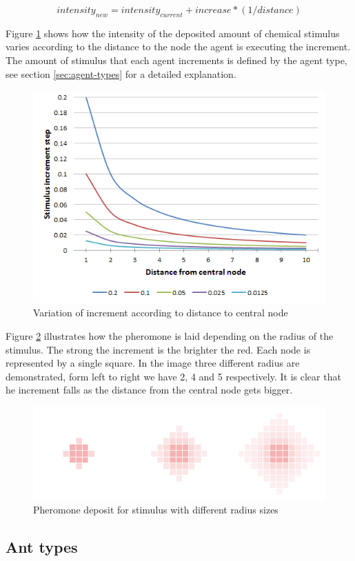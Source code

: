 \begin{equation}
intensity_{new} =  intensity_{current} + increase * (1 / distance)
\end{equation}

Figure \ref{fig:distanse-vs-inc} shows how the intensity of the deposited amount of chemical stimulus varies according to the distance to the node the agent is executing the increment. The amount of stimulus that each agent increments is defined by the agent type, see section \ref{sec:agent-types} for a detailed explanation.

\begin{figure}[H]
  \centering
  \includegraphics[width=0.5\linewidth]{gfx/distance-vs-increment.png}
  \caption{Variation of increment according to distance to central node}
  \label{fig:distanse-vs-inc}
\end{figure}

Figure \ref{fig:intensity-example} illustrates how the pheromone is laid depending on the radius of the stimulus. The strong the increment is the brighter the red. Each node is represented by a single square. In the image three different radius are demonstrated, form left to right we have 2, 4 and 5 respectively. It is clear that he increment falls as the distance from the central node gets bigger.

\begin{figure}[H]
  \centering
  \includegraphics[width=0.5\linewidth]{gfx/intensity-example.png}
  \caption{Pheromone deposit for stimulus with different radius sizes}
  \label{fig:intensity-example}
\end{figure}

\subsection{Ant types}


